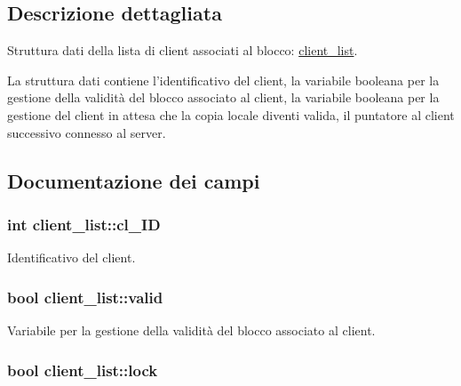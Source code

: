 \subsection{Descrizione dettagliata}
Struttura dati della lista di client associati al blocco: \hyperlink{structclient__list}{client\_\-list}. 

La struttura dati contiene l'identificativo del client, la variabile booleana per la gestione della validità del blocco associato al client, la variabile booleana per la gestione del client in attesa che la copia locale diventi valida, il puntatore al client successivo connesso al server. 

\subsection{Documentazione dei campi}
\hypertarget{structclient__list_3dd69ca49266d1f26a0324be11a1ce89_3dd69ca49266d1f26a0324be11a1ce89}{
\subsubsection[{cl\_\-ID}]{\setlength{\rightskip}{0pt plus 5cm}int {\bf client\_\-list::cl\_\-ID}}}
\label{structclient__list_3dd69ca49266d1f26a0324be11a1ce89_3dd69ca49266d1f26a0324be11a1ce89}


Identificativo del client. 

\hypertarget{structclient__list_0472ce71de752ddef8a4cd7410eee065_0472ce71de752ddef8a4cd7410eee065}{
\subsubsection[{valid}]{\setlength{\rightskip}{0pt plus 5cm}bool {\bf client\_\-list::valid}}}
\label{structclient__list_0472ce71de752ddef8a4cd7410eee065_0472ce71de752ddef8a4cd7410eee065}


Variabile per la gestione della validità del blocco associato al client. 

\hypertarget{structclient__list_7c62f5d8c3576121a64be202bc67b0a2_7c62f5d8c3576121a64be202bc67b0a2}{
\subsubsection[{lock}]{\setlength{\rightskip}{0pt plus 5cm}bool {\bf client\_\-list::lock}}}
\label{structclient__list_7c62f5d8c3576121a64be202bc67b0a2_7c62f5d8c3576121a64be202bc67b0a2}


